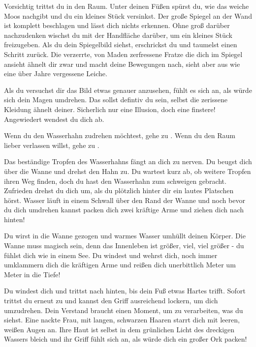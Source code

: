 
Vorsichtig trittst du in den Raum. Unter deinen Füßen spürst du, wie das weiche Moos nachgibt und du ein kleines Stück versinkst. Der große Spiegel an der Wand ist komplett beschlagen und lässt dich nichts erkennen. Ohne groß darüber nachzudenken wischst du mit der Handfläche darüber, um ein kleines Stück freizugeben. Als du dein Spiegelbild siehst, erschrickst du und taumelst einen Schritt zurück. Die verzerrte, von Maden zerfressene Fratze die dich im Spiegel ansieht ähnelt dir zwar und macht deine Bewegungen nach, sieht aber aus wie eine über Jahre vergessene Leiche.

Als du versuchst dir das Bild etwas genauer anzusehen, fühlt es sich an, als würde sich dein Magen umdrehen. Das sollst defintiv du sein, selbst die zerissene Kleidung ähnelt deiner. Sicherlich nur eine Illusion, doch eine finstere! Angewiedert wendest du dich ab.

Wenn du den Wasserhahn zudrehen möchtest, gehe zu .
Wenn du den Raum lieber verlassen willst, gehe zu .


Das beständige Tropfen des Wasserhahns fängt an dich zu nerven. Du beugst dich über die Wanne und drehst den Hahn zu. Du wartest kurz ab, ob weitere Tropfen ihren Weg finden, doch du hast den Wasserhahn zum schweigen gebracht. Zufrieden drehst du dich um, als du plötzlich hinter dir ein lautes Platschen hörst. Wasser läuft in einem Schwall über den Rand der Wanne und noch bevor du dich umdrehen kannst packen dich zwei kräftige Arme und ziehen dich nach hinten!

Du wirst in die Wanne gezogen und warmes Wasser umhüllt deinen Körper. Die Wanne muss magisch sein, denn das Innenleben ist größer, viel, viel größer - du fühlst dich wie in einem See. Du windest und wehrst dich, noch immer umklammern dich die kräftigen Arme und reißen dich unerbittlich Meter um Meter in die Tiefe!

Du windest dich und trittst nach hinten, bis dein Fuß etwas Hartes trifft. Sofort trittst du erneut zu und kannst den Griff ausreichend lockern, um dich umzudrehen. Dein Verstand braucht einen Moment, um zu verarbeiten, was du siehst. Eine nackte Frau, mit langen, schwarzen Haaren starrt dich mit leeren, weißen Augen an. Ihre Haut ist selbst in dem grünlichen Licht des dreckigen Wassers bleich und ihr Griff fühlt sich an, als würde dich ein großer Ork packen!

